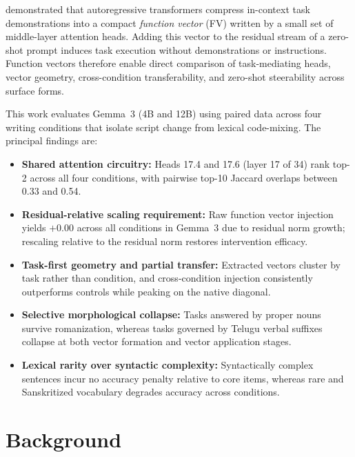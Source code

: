 \documentclass[11pt]{article}
\begin{document}
\citet{todd2024function} demonstrated that autoregressive transformers compress
in-context task demonstrations into a compact \emph{function vector} (FV)
written by a small set of middle-layer attention heads. Adding this vector to
the residual stream of a zero-shot prompt induces task execution without
demonstrations or instructions. Function vectors therefore enable direct
comparison of task-mediating heads, vector geometry, cross-condition
transferability, and zero-shot steerability across surface forms.

This work evaluates Gemma~3 (4B and 12B) using paired data across four writing
conditions that isolate script change from lexical code-mixing. The principal
findings are:
\begin{itemize}
  \item \textbf{Shared attention circuitry:} Heads 17.4 and 17.6 (layer 17 of
    34) rank top-2 across all four conditions, with pairwise top-10 Jaccard
    overlaps between 0.33 and 0.54.
  \item \textbf{Residual-relative scaling requirement:} Raw function vector
    injection yields $+0.00$ across all conditions in Gemma~3 due to residual
    norm growth; rescaling relative to the residual norm restores intervention
    efficacy.
  \item \textbf{Task-first geometry and partial transfer:} Extracted vectors
    cluster by task rather than condition, and cross-condition injection
    consistently outperforms controls while peaking on the native diagonal.
  \item \textbf{Selective morphological collapse:} Tasks answered by proper
    nouns survive romanization, whereas tasks governed by Telugu verbal
    suffixes collapse at both vector formation and vector application stages.
  \item \textbf{Lexical rarity over syntactic complexity:} Syntactically
    complex sentences incur no accuracy penalty relative to core items, whereas
    rare and Sanskritized vocabulary degrades accuracy across conditions.
\end{itemize}

\section{Background}
\end{document}
